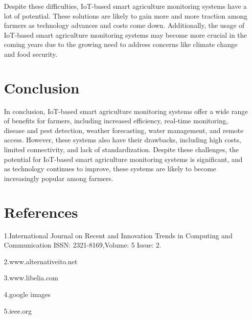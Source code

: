 \documentclass{wsdcr}
\begin{document}
Despite these difficulties, IoT-based smart agriculture monitoring systems have a lot of potential. These solutions are likely to gain more and more traction among farmers as technology advances and costs come down. Additionally, the usage of IoT-based smart agriculture monitoring systems may become more crucial in the coming years due to the growing need to address concerns like climate change and food security.


\section{Conclusion}
In conclusion, IoT-based smart agriculture monitoring systems offer a wide range of benefits for farmers, including increased efficiency, real-time monitoring, disease and pest detection, weather forecasting, water management, and remote access. However, these systems also have their drawbacks, including high costs, limited connectivity, and lack of standardization. Despite these challenges, the potential for IoT-based smart agriculture monitoring systems is significant, and as technology continues to improve, these systems are likely to become increasingly popular among farmers.

\section{References}
1.International Journal on Recent and Innovation Trends in Computing and Communication ISSN: 2321-8169,Volume: 5 Issue: 2.

2.www.alternativeito.net

3.www.libelia.com

4.google images 

5.ieee.org
\end{document}

